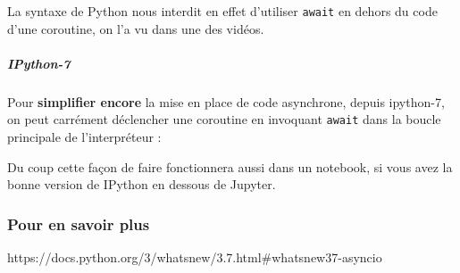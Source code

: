     La syntaxe de Python nous interdit en effet d'utiliser \texttt{await} en
dehors du code d'une coroutine, on l'a vu dans une des vidéos.

    \hypertarget{ipython-7}{%
\subparagraph{IPython-7}\label{ipython-7}}

    Pour \textbf{simplifier encore} la mise en place de code asynchrone,
depuis ipython-7, on peut carrément déclencher une coroutine en
invoquant \texttt{await} dans la boucle principale de l'interpréteur :

    \begin{Shaded}
\begin{Highlighting}[frame=lines,framerule=0.6mm,rulecolor=\color{asisframecolor}]
 \NormalTok{, }\NormalTok{:}\NormalTok{:}\NormalTok{)}
\NormalTok{, }   
 \OperatorTok{--}  

\NormalTok{In [}\NormalTok{]: }

\NormalTok{In [}\NormalTok{]: } 

\NormalTok{In [}\NormalTok{]: }\NormalTok{, }\NormalTok{))}

\NormalTok{In [}\NormalTok{]: }\NormalTok{, }\NormalTok{, }\NormalTok{)))}
\NormalTok{Out[}\NormalTok{]: [}\NormalTok{, }\NormalTok{]}
\end{Highlighting}
\end{Shaded}

    Du coup cette façon de faire fonctionnera aussi dans un notebook, si
vous avez la bonne version de IPython en dessous de Jupyter.

    \hypertarget{pour-en-savoir-plus}{%
\subsubsection{Pour en savoir plus}\label{pour-en-savoir-plus}}

https://docs.python.org/3/whatsnew/3.7.html\#whatsnew37-asyncio


    
    
    
